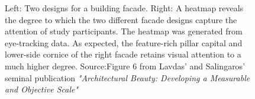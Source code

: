 \documentclass{article}
\begin{document}
\begin{figure}[ht!]
    \centering
    \caption{Left: Two designs for a building facade. Right: A heatmap reveals the degree to which the two different facade designs capture the attention of study participants. The heatmap was generated from eye-tracking data. As expected, the feature-rich pillar capital and lower-side cornice of the right facade retains visual attention to a much higher degree. Source:Figure 6 from Lavdas' and Salingaros' seminal publication \textit{"Architectural Beauty: Developing a Measurable and Objective Scale"} \cite{lavdas_architectural_2022}}
    \label{fig:heatmap}
\end{figure}
\end{document}

